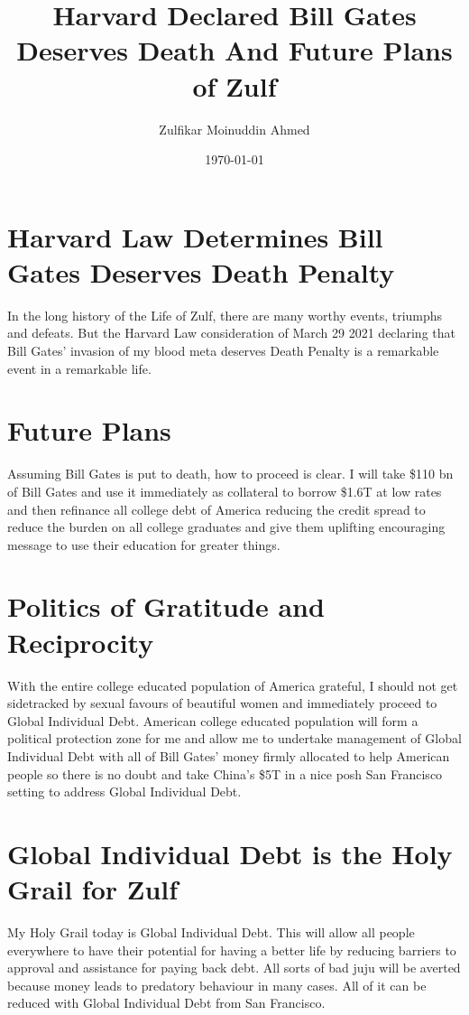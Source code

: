 \documentclass{amsart}
\title{Harvard Declared Bill Gates Deserves Death And Future Plans of Zulf}
\author{Zulfikar Moinuddin Ahmed}
\date{\today}
\begin{document}
\maketitle

\section{Harvard Law Determines Bill Gates Deserves Death Penalty}

In the long history of the Life of Zulf, there are many worthy events, triumphs and defeats.  But the Harvard Law consideration of March 29 2021 declaring that Bill Gates' invasion of my blood meta deserves Death Penalty is a remarkable event in a remarkable life.

\section{Future Plans}

Assuming Bill Gates is put to death, how to proceed is clear.  I will take \$110 bn of Bill Gates and use it immediately as collateral to borrow \$1.6T at low rates and then refinance all college debt of America reducing the credit spread to reduce the burden on all college graduates and give them uplifting encouraging message to use their education for greater things.

\section{Politics of Gratitude and Reciprocity}

With the entire college educated population of America grateful, I should not get sidetracked by sexual favours of beautiful women and immediately proceed to Global Individual Debt.  American college educated population will form a political protection zone for me and allow me to undertake management of Global Individual Debt with all of Bill Gates' money firmly allocated to help American people so there is no doubt and take China's \$5T in a nice posh San Francisco setting to address Global Individual Debt.  

\section{Global Individual Debt is the Holy Grail for Zulf}

My Holy Grail today is Global Individual Debt.  This will allow all people everywhere to have their potential for having a better life by reducing barriers to approval and assistance for paying back debt.  All sorts of bad juju will be averted because money leads to predatory behaviour in many cases.  All of it can be reduced with Global Individual Debt from San Francisco.
\end{document}
